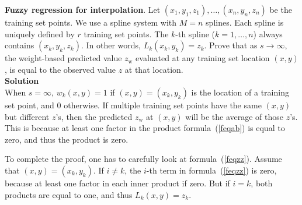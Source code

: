 \documentclass[oneside,10pt]{book}
\begin{document}
\begin{Exercise}\label{fex1}{\bf Fuzzy regression for interpolation}. Let $(x_1,y_1,z_1),\dots, (x_n,y_n,z_n)$ be the training set points. We use a spline system with $M=n$ splines. Each spline is uniquely defined by $r$ training set points. The $k$-th spline ($k=1,\dots,n$) always contains $(x_k, y_k, z_k)$. In other words, $L_k(x_k,y_k)=z_k$. Prove that as $s\rightarrow\infty$, the weight-based predicted value $z_{\text{w}}$ evaluated at any training set location $(x, y)$, is equal to the observed value $z$ at that location.  \vspace{1ex} \\
{\bf Solution} \vspace{1ex} \\
When $s=\infty$, $w_k(x,y)=1$ if $(x,y)=(x_k,y_k)$ is the location of a training set point, and $0$ otherwise. If multiple training set points have the same $(x,y)$ but different $z$'s, then the predicted $z_{\text{w}}$ at $(x,y)$ will be the average of those $z$'s. This is because at least one factor in the product formula~(\ref{feqab}) is equal to zero, and thus the product is zero.

\noindent To complete the proof, one has to carefully look at formula~(\ref{feqzz}). Assume that $(x,y)=(x_k,y_k)$. If $i\neq k$, the $i$-th term in formula~(\ref{feqzz}) is zero, because at least one factor in each inner product if zero. But if $i=k$, both products are equal to one, and thus $L_k(x,y)=z_k$.
\end{Exercise}
\end{document}
